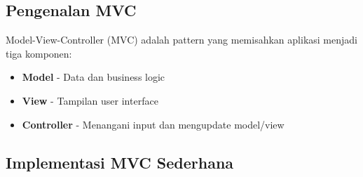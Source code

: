 \subsection{Pengenalan MVC}

Model-View-Controller (MVC) adalah pattern yang memisahkan aplikasi menjadi tiga komponen:

\begin{itemize}
\item \textbf{Model} - Data dan business logic
\item \textbf{View} - Tampilan user interface
\item \textbf{Controller} - Menangani input dan mengupdate model/view
\end{itemize}

\subsection{Implementasi MVC Sederhana}

